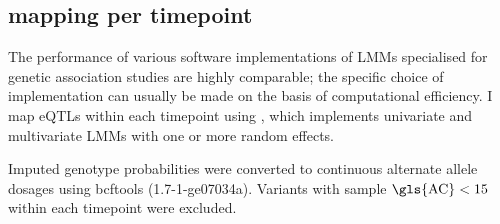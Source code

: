 \subsection{ mapping per timepoint}

%
The performance of various software implementations of \glspl{LMM} specialised for genetic association studies are highly comparable; 
the specific choice of implementation can usually be made on the basis of computational efficiency\autocite{eu-ahsunthornwattana2014ComparisonMethodsAccount}.
I map \glspl{eQTL} within each timepoint using \autocite{lippert2014LIMIXGeneticAnalysis}, which implements univariate and multivariate \glspl{LMM} with one or more random effects.

Imputed genotype probabilities were converted to continuous alternate allele dosages using bcftools (1.7-1-ge07034a).
Variants with sample $\text{\gls{AC}} < 15$ within each timepoint were excluded.
%

